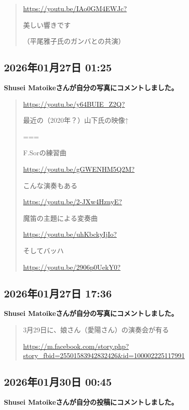 \begin{quote}
\url{https://youtu.be/IAo0GM4EWJc?}

美しい響きです

（平尾雅子氏のガンバとの共演）
\end{quote}

\subsection*{2026年01月27日 01:25}

\textbf{Shusei Matoikeさんが自分の写真にコメントしました。}

\begin{quote}
\url{https://youtu.be/y64BUIE_Z2Q?}

最近の（2020年？）山下氏の映像↑

===

F.Sorの練習曲

\url{https://youtu.be/gGWENHM5Q2M?}

こんな演奏もある

\url{https://youtu.be/2-JXw4HznyE?}

魔笛の主題による変奏曲

\url{https://youtu.be/uhKbckyIjIo?}

そしてバッハ

\url{https://youtu.be/2906p0UekY0?}
\end{quote}

\subsection*{2026年01月27日 17:36}

\textbf{Shusei Matoikeさんが自分の写真にコメントしました。}

\begin{quote}
3月29日に、娘さん（愛陽さん）の演奏会が有る

\url{https://m.facebook.com/story.php?story_fbid=25501583942832426&id=100002225117991}
\end{quote}

\subsection*{2026年01月30日 00:45}

\textbf{Shusei Matoikeさんが自分の投稿にコメントしました。}

